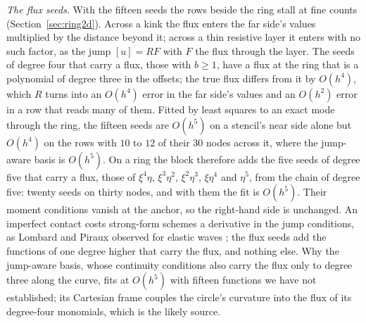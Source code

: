 \documentclass[11pt]{amsart}
\theoremstyle{definition}
\theoremstyle{remark}
\newcommand{\para}[1]{\par\smallskip\noindent\textit{#1}.\enspace}
\begin{document}
\para{The flux seeds}
With the fifteen seeds the rows beside the ring stall at fine counts
(Section~\ref{sec:ring2d}). Across a kink the flux enters the far side's
values multiplied by the distance beyond it; across a thin resistive layer
it enters with no such factor, as the jump $[u] = R F$ with $F$ the flux
through the layer. The seeds of degree four that carry a flux, those with
$b \ge 1$, have a flux at the ring that is a polynomial of degree three in
the offsets; the true flux differs from it by $O(h^4)$, which $R$ turns
into an $O(h^4)$ error in the far side's values and an $O(h^2)$ error in a
row that reads many of them. Fitted by least squares to an exact mode
through the ring, the fifteen seeds are $O(h^5)$ on a stencil's near side
alone but $O(h^4)$ on the rows with $10$ to $12$ of their $30$ nodes across
it, where the jump-aware basis is $O(h^5)$. On a ring the block therefore adds the five seeds of degree
five that carry a flux, those of $\xi^4 \eta$, $\xi^3 \eta^2$,
$\xi^2 \eta^3$, $\xi \eta^4$ and $\eta^5$, from the chain of degree five:
twenty seeds on thirty nodes, and with them the fit is $O(h^5)$. Their moment
conditions vanish at the anchor, so the right-hand side is unchanged. An
imperfect contact costs strong-form schemes a derivative in the jump
conditions, as Lombard and Piraux observed for elastic waves
\cite{LombardPiraux2003,LombardPiraux2006}; the flux seeds add the
functions of one degree higher that carry the flux, and nothing else. Why
the jump-aware basis, whose continuity conditions also carry the flux only
to degree three along the curve, fits at $O(h^5)$ with fifteen functions we
have not established; its Cartesian frame couples the circle's curvature
into the flux of its degree-four monomials, which is the likely source.
\end{document}
